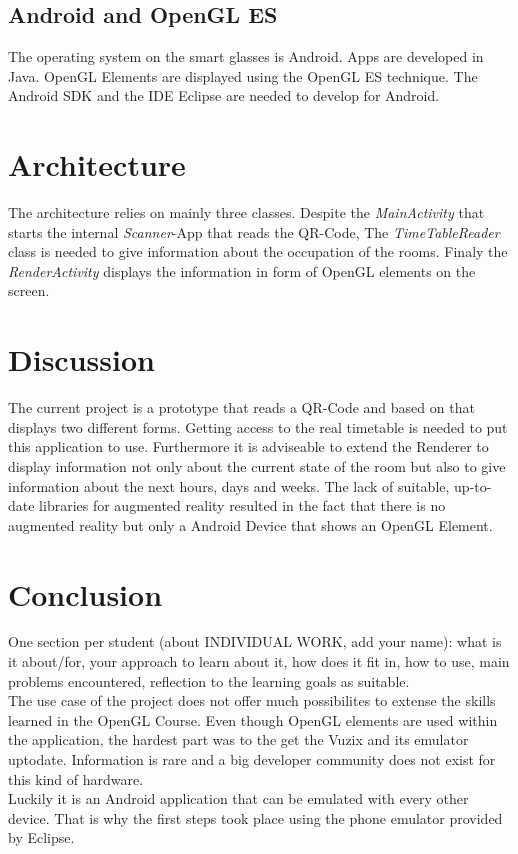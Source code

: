 \documentclass[]{article}
\begin{document}
\begin{multicols}{2}
\subsection{Android and OpenGL ES}
The operating system on the smart glasses is Android. Apps are developed in Java. OpenGL Elements are displayed using the OpenGL ES technique. 
\newline
The Android SDK and the IDE Eclipse are needed to develop for Android. 
\section{Architecture}
The architecture relies on mainly three classes. Despite the \emph{MainActivity} that starts the internal \emph{Scanner}-App that reads the QR-Code, The \emph{TimeTableReader} class is needed to give information about the occupation of the rooms. Finaly the \emph{RenderActivity} displays the information in form of OpenGL elements on the screen.   
\section{Discussion}
The current project is a prototype that reads a QR-Code and based on that displays two different forms. Getting access to the real timetable is needed to put this application to use. Furthermore it is adviseable to extend the Renderer to display information not only about the current state of the room but also to give information about the next hours, days and weeks.\newline
The lack of suitable, up-to-date libraries for augmented reality resulted in the fact that there is no augmented reality but only a Android Device that shows an OpenGL Element.  
\section{Conclusion}
One section per student (about INDIVIDUAL WORK, add your name): what is it about/for,
your approach to learn about it, how does it fit in, how to use, main problems encountered,
reflection to the learning goals as suitable.\\
The use case of the project does not offer much possibilites to extense the skills learned in the OpenGL Course. Even though OpenGL elements are used within the application, the hardest part was to the get the Vuzix and its emulator uptodate. Information is rare and a big developer community does not exist for this kind of hardware. \\
Luckily it is an Android application that can be emulated with every other device. That is why the first steps took place using the phone emulator provided by Eclipse. \\

\end{multicols}
\end{document}

